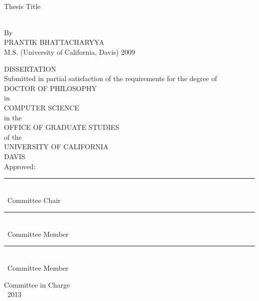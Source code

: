 \documentclass[letterpaper, 12pt, oneside]{book}
\theoremstyle{definition}
\theoremstyle{remark}
\numberwithin{equation}{section}
\numberwithin{figure}{section}
\newcommand{\n}{\vspace{12pt}} %
\begin{document}
    ~\vspace{-1in} %
    \begin{center}

       \begin{huge}
            Thesis Title
        \end{huge}
        \\\n\n
        By\\\n
        {\sc PRANTIK BHATTACHARYYA}\\\n
        M.S. (University of California, Davis) 2009\n\n      
         

        DISSERTATION\\\n
        Submitted in partial satisfaction of the requirements for the degree of\\\n
        DOCTOR OF PHILOSOPHY\\\n
        in\\\n
        COMPUTER SCIENCE\\\n
        in the\\\n
        OFFICE OF GRADUATE STUDIES\\\n
        of the\\\n
        UNIVERSITY OF CALIFORNIA\\\n
        DAVIS\\\n
%        
        Approved:\\\n\n
          
        \rule{4in}{1pt}\\
        ~Committee Chair\\\n\n
        
        \rule{4in}{1pt}\\
        ~Committee Member\\\n\n
        
       \rule{4in}{1pt}\\
        ~Committee Member\\\n

        
        Committee in Charge\\
        ~2013

    \end{center}
\end{document}
